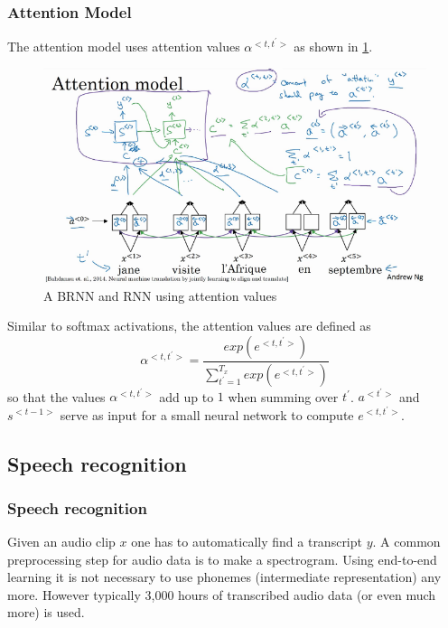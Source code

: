 \documentclass{article}
\begin{document}
\subsubsection{Attention Model}
The attention model uses attention values $\alpha^{<t,t^\prime>}$ as shown in \cref{fig:attention}.
\begin{figure}[htbp]
  \begin{center}
    \includegraphics[width=\textwidth]{attention}
    \caption{A BRNN and RNN using attention values}
    \label{fig:attention}
  \end{center}
\end{figure}
Similar to softmax activations, the attention values are defined as
\begin{equation}
  \alpha^{<t,t^\prime>}=\frac{exp(e^{<t,t^\prime>})}{\sum_{t^\prime=1}^{T_x}exp(e^{<t,t^\prime>})}
\end{equation}
so that the values $\alpha^{<t,t^\prime>}$ add up to $1$ when summing over $t^\prime$.
$a^{<t^\prime>}$ and $s^{<t-1>}$ serve as input for a small neural network to compute $e^{<t,t^\prime>}$.

\subsection{Speech recognition}
\subsubsection{Speech recognition}
Given an audio clip $x$ one has to automatically find a transcript $y$.
A common preprocessing step for audio data is to make a spectrogram.
Using end-to-end learning it is not necessary to use phonemes (intermediate representation) any more.
However typically 3,000 hours of transcribed audio data (or even much more) is used.
\end{document}
